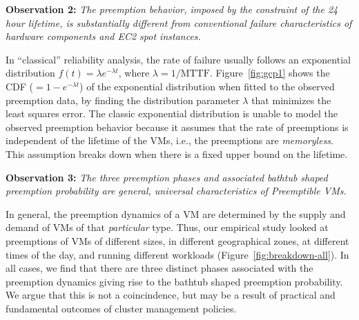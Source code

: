 

\noindent \textbf{Observation 2:} \emph{The preemption behavior, imposed by the constraint of the 24 hour lifetime, is substantially different from conventional failure characteristics of hardware components and EC2 spot instances.}

\noindent In ``classical'' reliability analysis, the rate of failure  usually follows an exponential distribution $f(t) = \lambda e^{-\lambda t}$, where $\lambda=1/\text{MTTF}$.
Figure~\ref{fig:gcp1} shows the CDF ($=1-e^{-\lambda t}$) of the exponential distribution when fitted to the observed preemption data, by finding the distribution parameter $\lambda$ that minimizes the least squares error.
The classic exponential distribution is unable to model the observed preemption behavior because it assumes that the rate of preemptions is independent of the lifetime of the VMs, i.e., the preemptions are \emph{memoryless}.
This assumption breaks down when there is a fixed upper bound on the lifetime. %

\noindent \textbf{Observation 3:} \emph{The three preemption phases and associated bathtub shaped preemption probability are general, universal characteristics of Preemptible VMs.}

In general, the preemption dynamics of a VM are determined by the supply and demand of VMs of that \emph{particular} type.
Thus, our empirical study looked at preemptions of VMs of different sizes, in different geographical zones, at different times of the day, and running different workloads (Figure~\ref{fig:breakdown-all}).
In all cases, we find that there are three distinct phases associated with the preemption dynamics giving rise to the bathtub shaped preemption probability. 
We argue that this is not a coincindence, but may be a result of practical and fundamental outcomes of cluster management policies. 

